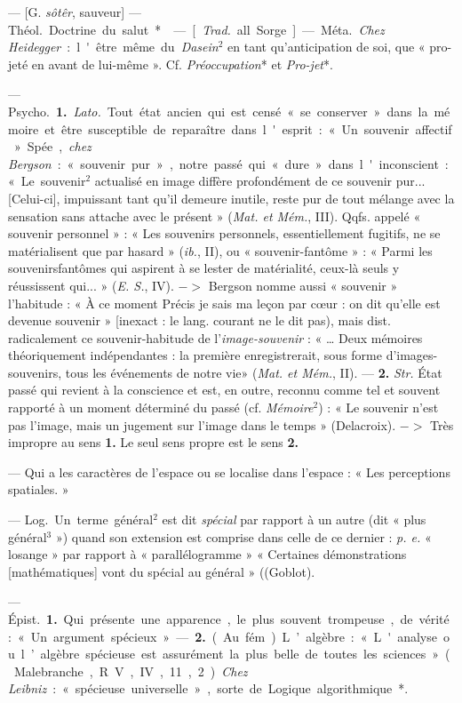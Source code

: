 \begin{itemize}[leftmargin=1cm, label=, itemsep=1pt]
 — [G. {\it sôtêr}, sauveur] —
\si{Théol.} Doctrine du salut*.

 — [{\it Trad.} all. Sorge] — \si{Méta.} {\it Chez Heidegger} :
l'être même du {\it Dasein}$^2$ en tant qu’anticipation de soi, que
« pro-jeté en avant de lui-même ». Cf. {\it Préoccupation}* et {\it Pro-jet}*.

 — \si{Psycho.} {\bf 1.} {\it Lato.} Tout état ancien qui est
censé « se conserver » dans la mémoire et être susceptible de reparaître dans
l'esprit : « Un souvenir affectif » Spée., {\it chez Bergson} : « souvenir
pur », notre passé qui « dure» dans l'inconscient : « Le souvenir$^2$
actualisé en image diffère profondément de ce souvenir pur... [Celui-ci],
impuissant tant qu'il demeure inutile, reste pur de tout mélange avec la
sensation sans attache avec le présent »
({\it Mat. et Mém.}, III). Qqfs. appelé « souvenir personnel » : « Les
souvenirs personnels, essentiellement fugitifs, ne se matérialisent que par
hasard » ({\it ib.}, II), ou « souvenir-fantôme » : « Parmi les
souvenirsfantômes qui aspirent à se lester de matérialité, ceux-là seuls y
réussissent qui... » ({\it E. S.}, IV). $->$ Bergson nomme aussi « souvenir »
l'habitude : « À ce moment Précis je sais ma leçon par cœur : on dit qu’elle
est devenue souvenir » [inexact : le lang. courant ne le dit pas), mais dist.
radicalement ce souvenir-habitude de l'{\it image-souvenir} : « … Deux
mémoires théoriquement indépendantes : la première enregistrerait, sous forme
d’images-souvenirs, tous les événements de notre vie» ({\it Mat. et Mém.},
II). — {\bf 2.} {\it Str.} État passé qui revient à la conscience et est, en
outre, reconnu comme tel et souvent rapporté à un moment déterminé du passé
(cf. {\it Mémoire}$^2$) : « Le souvenir n’est pas l’image, mais un jugement
sur l’image dans le temps » (Delacroix). $->$ Très impropre au sens {\bf 1.}
Le seul sens propre est le sens {\bf 2.}

 — Qui a les caractères de l’espace ou se localise dans
l’espace : « Les perceptions spatiales. »

 — \si{Log.} Un terme général$^2$ est dit {\it spécial} par
rapport à un autre (dit « plus général$^3$ ») quand son extension est
comprise dans celle de ce dernier : {\it p. e.} « losange » par rapport à «
parallélogramme » « Certaines démonstrations [mathématiques] vont du spécial
au général » ((Goblot).

 — \si{Épist.} {\bf 1.} Qui présente une apparence, le plus
souvent trompeuse, de vérité : « Un argument spécieux ». — {\bf 2.} (Au
fém.). L’algèbre :
« L'analyse ou l’algèbre spécieuse est assurément la plus belle de toutes les
sciences » (Malebranche, R. V., IV, 11, 2). {\it Chez Leibniz} : « spécieuse
universelle », sorte de Logique algorithmique*.


\end{itemize}
